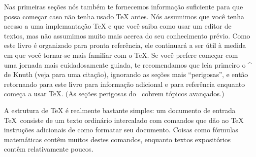 Nas primeiras seções nós também te fornecemos informação suficiente para que
possa começar caso não tenha usado \TeX{} antes. Nós assumimos que você tenha
acesso a uma implemantação \TeX{} e que você saiba como usar um editor de
textos, mas não assumimos muito mais acerca do seu conhecimento prévio. Como
este livro é organizado para pronta referência, ele continuará a ser útil à
medida em que você tornar-se mais familiar com o \TeX{}. Se você prefere começar
com uma jornada mais cuidadosamente guiada, te recomendamos que leia primeiro o
^{\texbook} de Knuth (veja  para uma citação), ignorando as
seções mais ``perigosas'', e então retornando para este livro para informação
adicional e para referência enquanto começa a usar \TeX{}. (As seções perigosas
do \texbook\ cobrem tópicos avançados.)

A estrutura de \TeX{} é realmente bastante simples: um documento de entrada
\TeX\ consiste de um texto ordinário intercalado com comandos que dão ao \TeX{}
instruções adicionais de como formatar seu documento. Coisas como fórmulas
matemáticas contêm muitos destes comandos, enquanto textos expositórios contêm
relativamente poucos.

